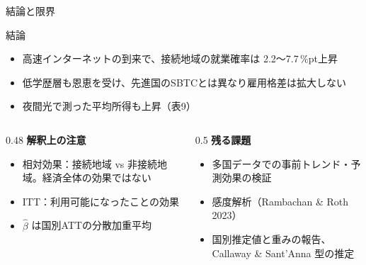 \documentclass[aspectratio=169,11pt]{beamer}
\newcommand{\pp}{\,\%pt}
\begin{document}
\begin{frame}{結論と限界}
  \begin{block}{結論}
    \begin{itemize}
      \item 高速インターネットの到来で、接続地域の就業確率は 2.2〜7.7\pp 上昇
      \item 低学歴層も恩恵を受け、先進国のSBTCとは異なり\alert{雇用格差は拡大しない}
      \item 夜間光で測った平均所得も上昇（表9）
    \end{itemize}
  \end{block}
  \vspace{0.3em}
  \begin{columns}[T]
    \begin{column}{0.48\textwidth}
      \textbf{解釈上の注意}
      \begin{itemize}\small
        \item \alert{相対効果}：接続地域 vs 非接続地域。経済全体の効果ではない
        \item \alert{ITT}：利用可能になったことの効果
        \item $\hat\beta$ は国別ATTの分散加重平均
      \end{itemize}
    \end{column}
    \begin{column}{0.5\textwidth}
      \textbf{残る課題}
      \begin{itemize}\small
        \item 多国データでの事前トレンド・予測効果の検証
        \item 感度解析（Rambachan \& Roth 2023）
        \item 国別推定値と重みの報告、Callaway \& Sant'Anna 型の推定
      \end{itemize}
    \end{column}
  \end{columns}
\end{frame}
\end{document}
